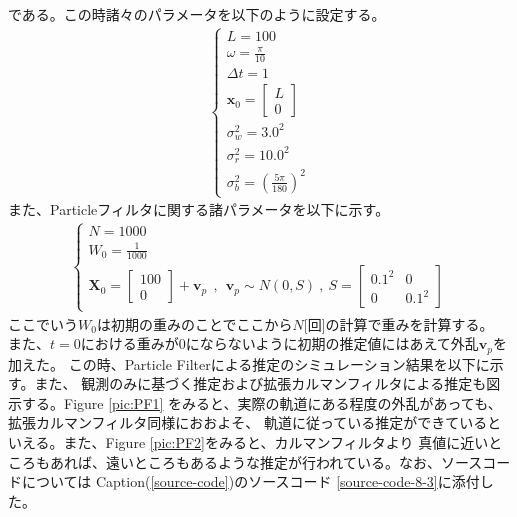 である。この時諸々のパラメータを以下のように設定する。
\begin{eqnarray}
  \left\{\begin{array}{l}
    L=100\\
    \omega = \frac{\pi}{10}\\
    \Delta t = 1\\
    \bm{x}_0 = \left[\begin{array}{c}
      L\\0
    \end{array}\right]\\
    \sigma_w^2 = 3.0^2\\
    \sigma_r^2 = 10.0^2\\
    \sigma_b^2 = \left(\frac{5\pi}{180}\right)^2
  \end{array}\right.
\end{eqnarray}
また、Particleフィルタに関する諸パラメータを以下に示す。
\begin{eqnarray}
  \left\{\begin{array}{l}
    N = 1000\\
    W_0 = \frac{1}{1000}\\
    \bm{X}_0 = \left[\begin{array}{c}
      100\\0
    \end{array}\right]+\bm{v}_p ~~,~~\bm{v}_p \sim N(0,S)~,~S=\left[\begin{array}{cc}
      0.1^2 & 0\\
      0&0.1^2
    \end{array}\right]
  \end{array}\right.
\end{eqnarray}
ここでいう$W_0$は初期の重みのことでここから$N$[回]の計算で重みを計算する。
また、$t=0$における重みが0にならないように初期の推定値にはあえて外乱$\bm{v}_p$を加えた。
この時、Particle Filterによる推定のシミュレーション結果を以下に示す。また、
観測のみに基づく推定および拡張カルマンフィルタによる推定も図示する。Figure \ref{pic:PF1}
をみると、実際の軌道にある程度の外乱があっても、拡張カルマンフィルタ同様におおよそ、
軌道に従っている推定ができているといえる。また、Figure \ref{pic:PF2}をみると、カルマンフィルタより
真値に近いところもあれば、遠いところもあるような推定が行われている。なお、ソースコードについては
Caption(\ref{source-code})のソースコード \ref{source-code-8-3}に添付した。
